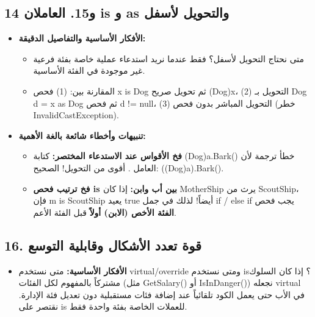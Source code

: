 \documentclass[14pt]{extarticle}
\begin{document}
\filbreak
\subsection*{14 و15. العاملان \textenglish{is} و \textenglish{as} والتحويل لأسفل}
\begin{itemize}[itemsep=0.3em]
    \item \textbf{الأفكار الأساسية والتفاصيل الدقيقة:}
    \begin{itemize}
        \item متى نحتاج التحويل لأسفل؟ فقط عندما نريد استدعاء عملية خاصة بفئة فرعية غير موجودة في الفئة الأساسية.
        \item المقارنة بين: (1) فحص \textenglish{x is Dog} ثم تحويل صريح \textenglish{(Dog)x}، (2) التحويل بـ \textenglish{Dog d = x as Dog} ثم فحص \textenglish{d != null}، (3) التحويل المباشر بدون فحص (خطر \textenglish{InvalidCastException}).
    \end{itemize}
    \item \textbf{تنبيهات وأخطاء شائعة بالغة الأهمية:}
    \begin{itemize}
        \item \textbf{فخ الأقواس عند الاستدعاء المختصر:} كتابة \textenglish{(Dog)a.Bark()} خطأ ترجمة لأن العامل \textenglish{.} أقوى من التحويل! الصحيح: \textenglish{((Dog)a).Bark()}.
        \item \textbf{فخ ترتيب فحص \textenglish{is} بين أب وابن:} إذا كان \textenglish{MotherShip} يرث من \textenglish{ScoutShip}، فإن \textenglish{m is ScoutShip} يعيد \textenglish{true} أيضاً! لذلك في جمل \textenglish{if / else if} يجب فحص \textbf{الفئة الأخص (الابن) أولاً} قبل الفئة الأعم.
    \end{itemize}
\end{itemize}

\filbreak
\subsection*{16. قوة تعدد الأشكال وقابلية التوسع}
\begin{itemize}[itemsep=0.3em]
    \item \textbf{الأفكار الأساسية:} متى نستخدم \textenglish{virtual/override} ومتى نستخدم \textenglish{is}؟ إذا كان السلوك مشتركاً بالمفهوم لكل الفئات (مثل \textenglish{GetSalary()} أو \textenglish{IsInDanger()}) نجعله \textenglish{virtual} في الأب حتى يعمل الكود تلقائياً عند إضافة فئات مستقبلية دون تعديل فئة الإدارة. نقتصر على \textenglish{is} للعملات الخاصة بفئة واحدة فقط.
\end{itemize}
\end{document}
